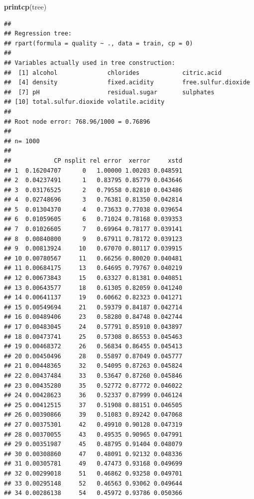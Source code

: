 \documentclass[]{book}
\newenvironment{Shaded}{\begin{snugshade}}{\end{snugshade}}
\newcommand{\KeywordTok}[1]{\textcolor[rgb]{0.13,0.29,0.53}{\textbf{#1}}}
\newcommand{\NormalTok}[1]{#1}
\theoremstyle{break}
\theoremstyle{definition}
\theoremstyle{definition}
\theoremstyle{definition}
\theoremstyle{remark}
\begin{document}
\begin{Shaded}
\begin{Highlighting}[]
\KeywordTok{printcp}\NormalTok{(tree)}
\end{Highlighting}
\end{Shaded}

\begin{verbatim}
## 
## Regression tree:
## rpart(formula = quality ~ ., data = train, cp = 0)
## 
## Variables actually used in tree construction:
##  [1] alcohol              chlorides            citric.acid         
##  [4] density              fixed.acidity        free.sulfur.dioxide 
##  [7] pH                   residual.sugar       sulphates           
## [10] total.sulfur.dioxide volatile.acidity    
## 
## Root node error: 768.96/1000 = 0.76896
## 
## n= 1000 
## 
##            CP nsplit rel error  xerror     xstd
## 1  0.16204707      0   1.00000 1.00203 0.048591
## 2  0.04237491      1   0.83795 0.85779 0.043646
## 3  0.03176525      2   0.79558 0.82810 0.043486
## 4  0.02748696      3   0.76381 0.81350 0.042814
## 5  0.01304370      4   0.73633 0.77038 0.039654
## 6  0.01059605      6   0.71024 0.78168 0.039353
## 7  0.01026605      7   0.69964 0.78177 0.039141
## 8  0.00840800      9   0.67911 0.78172 0.039123
## 9  0.00813924     10   0.67070 0.80117 0.039915
## 10 0.00780567     11   0.66256 0.80020 0.040481
## 11 0.00684175     13   0.64695 0.79767 0.040219
## 12 0.00673843     15   0.63327 0.81381 0.040851
## 13 0.00643577     18   0.61305 0.82059 0.041240
## 14 0.00641137     19   0.60662 0.82323 0.041271
## 15 0.00549694     21   0.59379 0.84187 0.042714
## 16 0.00489406     23   0.58280 0.84748 0.042744
## 17 0.00483045     24   0.57791 0.85910 0.043897
## 18 0.00473741     25   0.57308 0.86553 0.045463
## 19 0.00468372     26   0.56834 0.86455 0.045413
## 20 0.00450496     28   0.55897 0.87049 0.045777
## 21 0.00448365     32   0.54095 0.87263 0.045824
## 22 0.00437484     33   0.53647 0.87260 0.045846
## 23 0.00435280     35   0.52772 0.87772 0.046022
## 24 0.00428623     36   0.52337 0.87999 0.046124
## 25 0.00412515     37   0.51908 0.88151 0.046505
## 26 0.00390866     39   0.51083 0.89242 0.047068
## 27 0.00375301     42   0.49910 0.90128 0.047319
## 28 0.00370055     43   0.49535 0.90965 0.047991
## 29 0.00351987     45   0.48795 0.91404 0.048079
## 30 0.00308860     47   0.48091 0.92132 0.048336
## 31 0.00305781     49   0.47473 0.93168 0.049699
## 32 0.00299018     51   0.46862 0.93258 0.049701
## 33 0.00295148     52   0.46563 0.93062 0.049644
## 34 0.00286138     54   0.45972 0.93786 0.050366

\end{verbatim}
\end{document}
